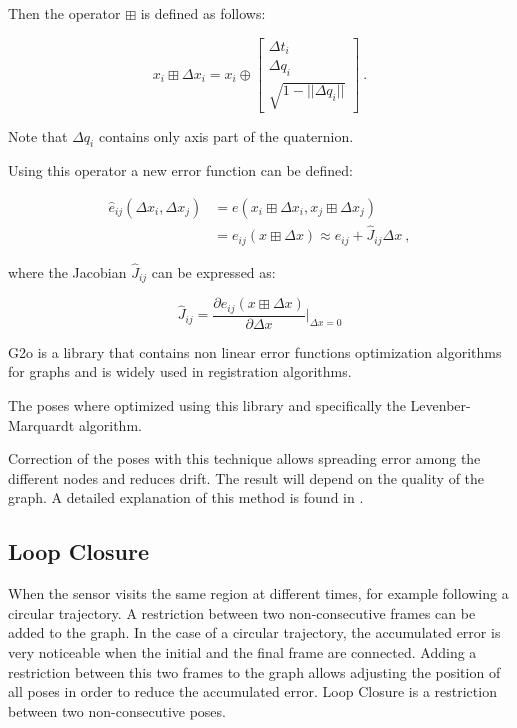 Then the operator $\boxplus$ is defined as follows:

$$
x_i \boxplus \Delta x_i = x_i \oplus \begin{bmatrix} \Delta t_i \\ \Delta q_i \\ \sqrt{1-||\Delta q_i||}  \end{bmatrix} \ .
$$

Note that $\Delta q_i$ contains only axis part of the quaternion.

Using this operator a new error function can be defined:

\begin{equation}
\begin{aligned}
\hat{e}_{ij}(\Delta x_i,\Delta x_j) &= e(x_i \boxplus \Delta x_i,x_j \boxplus \Delta x_j) \\
&= e_{ij}(x \boxplus \Delta x) \approx e_{ij} + \hat{J}_{ij} \Delta x \ ,
\end{aligned}
\end{equation}

\noindent where the Jacobian $\hat{J}_{ij}$ can be expressed as:

$$
\hat{J}_{ij} = \frac{\partial{e_{ij}(x \boxplus \Delta x)}}{\partial{\Delta x}} \bigg|_{\Delta x=0}
$$


G2o \cite{g2o} is a library that contains non linear error functions optimization 
algorithms for graphs and is widely used in registration algorithms. 

The poses where optimized using this library and specifically the 
Levenber-Marquardt algorithm.

Correction of the poses with this technique allows spreading error among the different nodes and reduces drift. The result 
will depend on the quality of the graph. A detailed explanation of this method is found in \cite{g2o}.

\subsection{Loop Closure}

When the sensor visits the same region at different times, for example following 
a circular trajectory. A restriction between two non-consecutive frames can be 
added to the graph. In the case of a circular trajectory, the accumulated error 
is very noticeable when the initial and the final frame are connected. Adding a 
restriction between this two frames to the graph allows adjusting 
the position of all poses in order to reduce the accumulated error. Loop Closure is 
a restriction between two non-consecutive poses.


